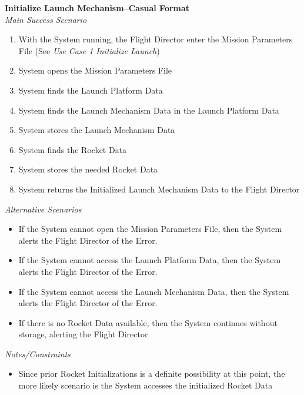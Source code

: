 \documentclass[letterpaper]{article}
\begin{document}
\noindent
\textbf{Initialize Launch Mechanism--Casual Format}\\
\textit{Main Success Scenario}
\begin{enumerate}
\item With the System running, the Flight Director enter the Mission
Parameters File (See \textit{Use Case 1 Initialize Launch})
\item System opens the Mission Parameters File
\item System finds the Launch Platform Data
\item System finds the Launch Mechanism Data in the Launch Platform
Data
\item System stores the Launch Mechanism Data
\item System finds the Rocket Data
\item System stores the needed Rocket Data
\item System returns the Initialized Launch Mechanism Data to the
Flight Director
\end{enumerate}
\textit{Alternative Scenarios}
\begin{itemize}
\item[2a.]If the System cannot open the Mission Parameters File, then
the System alerts the Flight Director of the Error.
\item[3a.]If the System cannot access the Launch Platform Data, then
the System alerts the Flight Director of the Error.
\item[4a.]If the System cannot access the Launch Mechanism Data, then
the System alerts the Flight Director of the Error.
\item[6a.,7a.]If there is no Rocket Data available, then the System
continues without storage, alerting the Flight Director
\end{itemize}
\textit{Notes/Constraints}
\begin{itemize}
\item[6b.,7b.]Since prior Rocket Initializations is a definite
possibility at this point, the more likely scenario is the System
accesses the initialized Rocket Data
\end{itemize}
\end{document}
